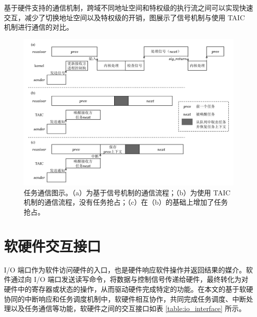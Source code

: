 基于硬件支持的通信机制，跨域不同地址空间和特权级的执行流之间可以实现快速交互，减少了切换地址空间以及特权级的开销，图展示了信号机制与使用 TAIC 机制进行通信的对比。

\begin{figure}
    \centering
    \includegraphics[width=\textwidth]{figures/pdfs/communicate_demo.pdf}
    \caption[任务通信图示]{任务通信图示。（a）为基于信号机制的通信流程；（b）为使用 TAIC 机制的通信流程，没有任务抢占；（c）在（b）的基础上增加了任务抢占。}
\end{figure}

\section{软硬件交互接口}

I/O 端口作为软件访问硬件的入口，也是硬件响应软件操作并返回结果的媒介。软件通过向 I/O 端口发送读写命令，将数据与控制信号传递给硬件，最终转化为对硬件中的寄存器或状态的操作，从而驱动硬件完成特定的功能。在本文的基于软硬协同的中断响应和任务调度机制中，软硬件相互协作，共同完成任务调度、中断处理以及任务通信等功能，软硬件之间的交互接口如表 \ref{table:io_interface} 所示。

